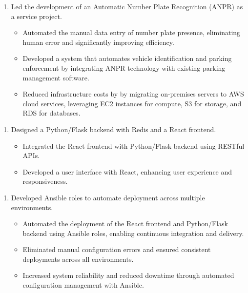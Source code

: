 \documentclass{article}
\begin{document}
\begin{enumerate}
  \item [] Led the development of an Automatic Number Plate Recognition (ANPR) as a service project.
   \begin{itemize}
   \item Automated the manual data entry of number plate presence, eliminating human error and significantly improving efficiency.
   \item Developed a system that automates vehicle identification and parking enforcement by integrating ANPR technology with existing parking management software.
    \item Reduced infrastructure costs by  by migrating on-premises servers to AWS cloud services, leveraging EC2 instances for compute, S3 for storage, and RDS for databases.
   \end{itemize}
\end{enumerate}
\vspace{-1.6em}
\begin{enumerate}
    \item[] Designed a Python/Flask backend with Redis and a React frontend. 
   \begin{itemize}
    \item Integrated the React frontend with  Python/Flask backend using RESTful APIs.
    \item Developed a  user interface with React, enhancing user experience and responsiveness.
   \end{itemize}
\end{enumerate}


\begin{enumerate}
    \item[] Developed Ansible roles to automate deployment across multiple environments.
   \begin{itemize}
    \item Automated the deployment of the React frontend and Python/Flask backend using Ansible roles, enabling continuous integration and delivery.
    \item Eliminated manual configuration errors and ensured consistent deployments across all environments.  
    \item Increased system reliability and reduced downtime through automated configuration management with Ansible.
   \end{itemize}
\end{enumerate}
\end{document}
